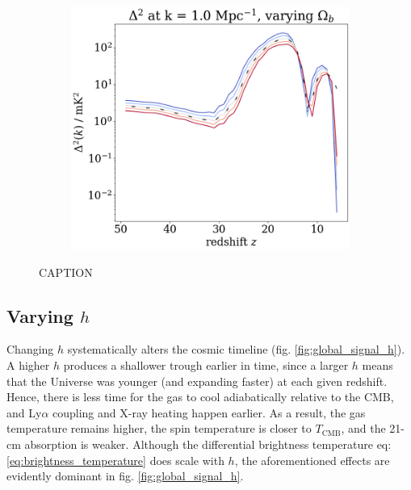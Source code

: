 \documentclass[floats,floatfix,showpacs,amssymb,prd,superscriptaddress,nofootinbib]{revtex4-2} %
\begin{document}
\begin{figure}[H]
\begin{subfigure}[b]{0.45\textwidth}
         \label{fig:power_spectrum_fixed_k_0.1_Ob}
     \end{subfigure}
     \hfill
     \begin{subfigure}[b]{0.45\textwidth}
         \centering
         \includegraphics[width=\textwidth]{images/simulation_results/power_spectrum_fixed_k_1.0_Ob.png}
         \label{fig:power_spectrum_fixed_k_1.0_Ob}
     \end{subfigure}
        \caption{CAPTION}
        \label{fig:simulation_results_Ob}
\end{figure}

\subsection{Varying $h$}

Changing $h$ systematically alters the cosmic timeline (fig. \ref{fig:global_signal_h}). A higher $h$ produces a shallower trough earlier in time, since a larger $h$ means that the Universe was younger (and expanding faster) at each given redshift. Hence, there is less time for the gas to cool adiabatically relative to the CMB, and Ly$\alpha$ coupling and X-ray heating happen earlier. As a result, the gas temperature remains higher, the spin temperature is closer to $T_{\text{CMB}}$, and the 21-cm absorption is weaker. Although the differential brightness temperature eq: \ref{eq:brightness_temperature} does scale with $h$, the aforementioned effects are evidently dominant in fig. \ref{fig:global_signal_h}. 
\end{document}
